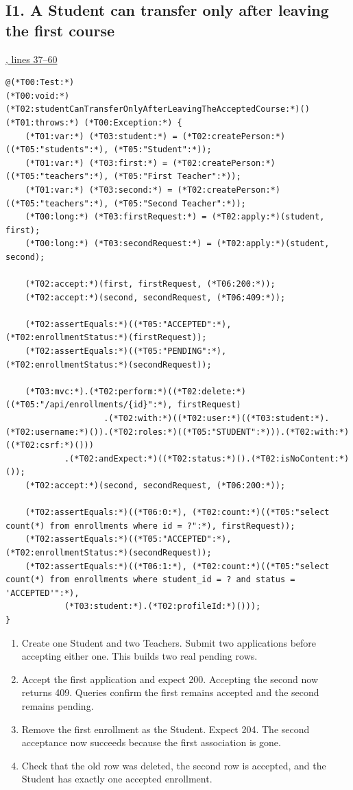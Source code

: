 \subsection{I1. A Student can transfer only after leaving the first course}
\par\smallskip
{\small\href{\repo/blob/5d22aed7f6d4ef1e4c0b0c0dabf2962ba4b47608/src/test/java/com/example/fmschool/EnrollmentPersistenceIT.java#L37-L60}{, lines 37--60}}
\begin{lstlisting}[style=vsJava,firstnumber=37]
@(*T00:Test:*)
(*T00:void:*) (*T02:studentCanTransferOnlyAfterLeavingTheAcceptedCourse:*)() (*T01:throws:*) (*T00:Exception:*) {
    (*T01:var:*) (*T03:student:*) = (*T02:createPerson:*)((*T05:"students":*), (*T05:"Student":*));
    (*T01:var:*) (*T03:first:*) = (*T02:createPerson:*)((*T05:"teachers":*), (*T05:"First Teacher":*));
    (*T01:var:*) (*T03:second:*) = (*T02:createPerson:*)((*T05:"teachers":*), (*T05:"Second Teacher":*));
    (*T00:long:*) (*T03:firstRequest:*) = (*T02:apply:*)(student, first);
    (*T00:long:*) (*T03:secondRequest:*) = (*T02:apply:*)(student, second);

    (*T02:accept:*)(first, firstRequest, (*T06:200:*));
    (*T02:accept:*)(second, secondRequest, (*T06:409:*));

    (*T02:assertEquals:*)((*T05:"ACCEPTED":*), (*T02:enrollmentStatus:*)(firstRequest));
    (*T02:assertEquals:*)((*T05:"PENDING":*), (*T02:enrollmentStatus:*)(secondRequest));

    (*T03:mvc:*).(*T02:perform:*)((*T02:delete:*)((*T05:"/api/enrollments/{id}":*), firstRequest)
                    .(*T02:with:*)((*T02:user:*)((*T03:student:*).(*T02:username:*)()).(*T02:roles:*)((*T05:"STUDENT":*))).(*T02:with:*)((*T02:csrf:*)()))
            .(*T02:andExpect:*)((*T02:status:*)().(*T02:isNoContent:*)());
    (*T02:accept:*)(second, secondRequest, (*T06:200:*));

    (*T02:assertEquals:*)((*T06:0:*), (*T02:count:*)((*T05:"select count(*) from enrollments where id = ?":*), firstRequest));
    (*T02:assertEquals:*)((*T05:"ACCEPTED":*), (*T02:enrollmentStatus:*)(secondRequest));
    (*T02:assertEquals:*)((*T06:1:*), (*T02:count:*)((*T05:"select count(*) from enrollments where student_id = ? and status = 'ACCEPTED'":*),
            (*T03:student:*).(*T02:profileId:*)()));
}
\end{lstlisting}


\begin{enumerate}
\item Create one Student and two Teachers. Submit two applications before
accepting either one. This builds two real pending rows.
\item Accept the first application and expect 200. Accepting the second now
returns 409. Queries confirm the first remains accepted and the second remains
pending.
\item Remove the first enrollment as the Student. Expect 204. The second
acceptance now succeeds because the first association is gone.
\item Check that the old row was deleted, the second row is accepted, and the
Student has exactly one accepted enrollment.
\end{enumerate}

